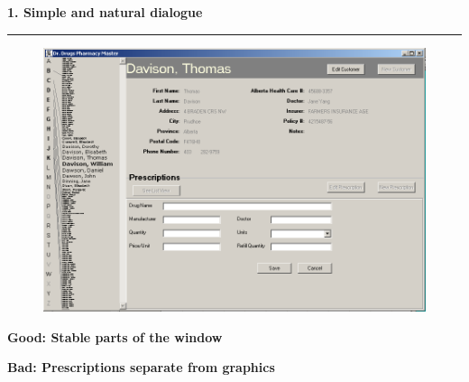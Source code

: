 \documentclass[pdf]{beamer}
\begin{document}
\begin{frame}
{\textbf{1. Simple and natural dialogue}}{\textcolor{red}{\rule{12cm}{1.2pt}}}

	\begin{figure}[b]
      \includegraphics[scale = 0.47]{11_Picture1.png}
  	\end{figure}

    \hspace{150px}\fontsize{7pt}{10pt}\textbf{Good: Stable parts of the window}

   \hspace{150px}\fontsize{7pt}{10pt}\textbf{Bad: Prescriptions separate from graphics}
   
 	\fontsize{4pt}{0.5pt}
\end{frame}
\end{document}

